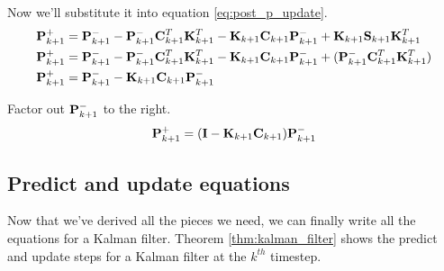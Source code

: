 Now we'll substitute it into equation \eqref{eq:post_p_update}.
\begin{align*}
  \mathbf{P}_{k+1}^+ &=
    \mathbf{P}_{k+1}^- - \mathbf{P}_{k+1}^-\mathbf{C}_{k+1}^T\mathbf{K}_{k+1}^T -
    \mathbf{K}_{k+1}\mathbf{C}_{k+1}\mathbf{P}_{k+1}^- +
    \mathbf{K}_{k+1}\mathbf{S}_{k+1}\mathbf{K}_{k+1}^T \\
  \mathbf{P}_{k+1}^+ &=
    \mathbf{P}_{k+1}^- - \mathbf{P}_{k+1}^-\mathbf{C}_{k+1}^T\mathbf{K}_{k+1}^T -
    \mathbf{K}_{k+1}\mathbf{C}_{k+1}\mathbf{P}_{k+1}^- +
    (\mathbf{P}_{k+1}^-\mathbf{C}_{k+1}^T\mathbf{K}_{k+1}^T) \\
  \mathbf{P}_{k+1}^+ &=
    \mathbf{P}_{k+1}^- - \mathbf{K}_{k+1}\mathbf{C}_{k+1}\mathbf{P}_{k+1}^-
\end{align*}

Factor out $\mathbf{P}_{k+1}^-$ to the right.
\begin{equation*}
  \mathbf{P}_{k+1}^+ = (\mathbf{I} - \mathbf{K}_{k+1}\mathbf{C}_{k+1})\mathbf{P}_{k+1}^-
\end{equation*}

\subsection{Predict and update equations}

Now that we've derived all the pieces we need, we can finally write all the
equations for a Kalman filter. Theorem \ref{thm:kalman_filter} shows the predict
and update steps for a Kalman filter at the $k^{th}$ timestep.

